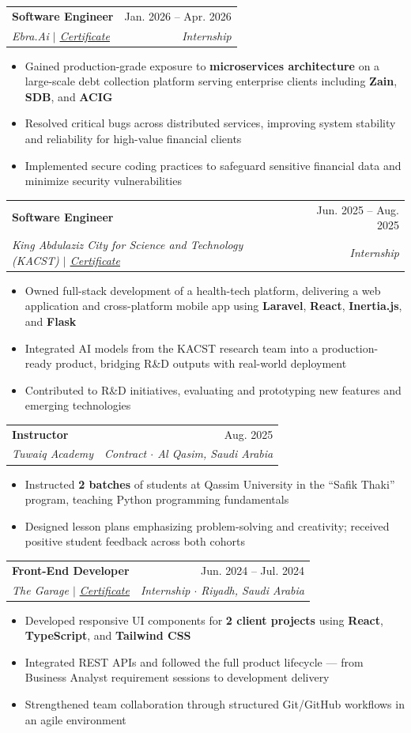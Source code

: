 \documentclass[letterpaper,11pt]{article}
\makeatletter
\newcommand{\resumeItem}[1]{
  \item\small{{#1 \vspace{-2pt}}}
}
\newcommand{\resumeSubheading}[4]{
  \vspace{4pt}\item
    \begin{tabular*}{0.97\textwidth}[t]{l@{\extracolsep{\fill}}r}
      \textbf{#1} & #2 \\
      \textit{\small#3} & \textit{\small #4} \\
    \end{tabular*}\vspace{-6pt}
}
\newcommand{\resumeItemListStart}{\begin{itemize}}
\newcommand{\resumeItemListEnd}{\end{itemize}\vspace{-3pt}}
\newcommand{\metric}[1]{\textbf{#1}}
\makeatother
\begin{document}
    \resumeSubheading
      {Software Engineer}{Jan. 2026 -- Apr. 2026}
      {Ebra.Ai $|$ \href{https://drive.google.com/file/d/1kLDQiSK5mVVJ14284zqw9NFVpJ8r6SD2/view?usp=sharing}{\underline{Certificate}}}{Internship}
      \resumeItemListStart
        \resumeItem{Gained production-grade exposure to \metric{microservices architecture} on a large-scale debt collection platform serving enterprise clients including \metric{Zain}, \metric{SDB}, and \metric{ACIG}}
        \resumeItem{Resolved critical bugs across distributed services, improving system stability and reliability for high-value financial clients}
        \resumeItem{Implemented secure coding practices to safeguard sensitive financial data and minimize security vulnerabilities}
      \resumeItemListEnd

    \resumeSubheading
      {Software Engineer}{Jun. 2025 -- Aug. 2025}
      {King Abdulaziz City for Science and Technology (KACST) $|$ \href{https://drive.google.com/file/d/11nhZ4IlFd_xPXfLy5T-NxemcF6wppDgC/view?usp=sharing}{\underline{Certificate}}}{Internship}
      \resumeItemListStart
        \resumeItem{Owned full-stack development of a health-tech platform, delivering a web application and cross-platform mobile app using \metric{Laravel}, \metric{React}, \metric{Inertia.js}, and \metric{Flask}}
        \resumeItem{Integrated AI models from the KACST research team into a production-ready product, bridging R\&D outputs with real-world deployment}
        \resumeItem{Contributed to R\&D initiatives, evaluating and prototyping new features and emerging technologies}
      \resumeItemListEnd

    \resumeSubheading
      {Instructor}{Aug. 2025}
      {Tuwaiq Academy}{Contract $\cdot$ Al Qasim, Saudi Arabia}
      \resumeItemListStart
        \resumeItem{Instructed \metric{2 batches} of students at Qassim University in the ``Safik Thaki'' program, teaching Python programming fundamentals}
        \resumeItem{Designed lesson plans emphasizing problem-solving and creativity; received positive student feedback across both cohorts}
      \resumeItemListEnd

    \resumeSubheading
      {Front-End Developer}{Jun. 2024 -- Jul. 2024}
      {The Garage $|$ \href{https://drive.google.com/file/d/15y2eeOO8qvOEawHidHFDownuc0Kph1RG/view}{\underline{Certificate}}}{Internship $\cdot$ Riyadh, Saudi Arabia}
      \resumeItemListStart
        \resumeItem{Developed responsive UI components for \metric{2 client projects} using \metric{React}, \metric{TypeScript}, and \metric{Tailwind CSS}}
        \resumeItem{Integrated REST APIs and followed the full product lifecycle --- from Business Analyst requirement sessions to development delivery}
        \resumeItem{Strengthened team collaboration through structured Git/GitHub workflows in an agile environment}
      \resumeItemListEnd
\end{document}
